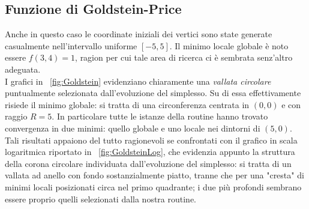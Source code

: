 \begin{figure}
	\label{fig:RelativeEasom}
\end{figure}

\newpage

\subsection*{Funzione di Goldstein-Price}

Anche in questo caso le coordinate iniziali dei vertici sono state generate casualmente nell'intervallo uniforme $\![-5,5]$. Il minimo locale globale è noto essere $f(3,4) = 1$, ragion per cui tale area di ricerca ci è sembrata senz'altro adeguata.\\

\noindent I grafici in \figurename~\ref{fig:Goldstein} evidenziano chiaramente una \emph{vallata circolare} puntualmente selezionata dall'evoluzione del simplesso. Su di essa effettivamente risiede il minimo globale: si tratta di una circonferenza centrata in $(0,0)$ e con raggio $R=5$. In particolare tutte le istanze della routine hanno trovato convergenza in due minimi: quello globale e uno locale nei dintorni di $(5,0)$.\\

\noindent Tali risultati appaiono del tutto ragionevoli se confrontati con il grafico in scala logaritmica riportato in \figurename~\ref{fig:GoldsteinLog}, che evidenzia appunto la struttura della corona circolare individuata dall'evoluzione del simplesso: si tratta di un vallata ad anello con fondo sostanzialmente piatto, tranne che per una "cresta" di minimi locali posizionati circa nel primo quadrante; i due più profondi sembrano essere proprio quelli selezionati dalla nostra routine.

\vfill


